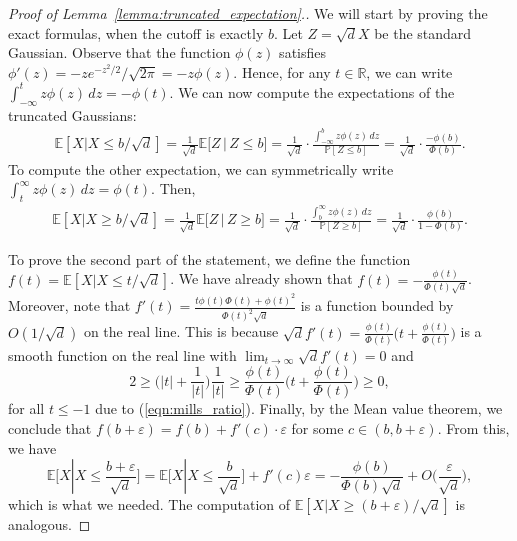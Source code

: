 \documentclass[11pt]{amsart}
\theoremstyle{definition}
\def\eps{\varepsilon}
\def\bE{\mathbb{E}}
\def\bR{\mathbb{R}}
\def\Pb{\mathbb{P}}
\begin{document}
\begin{proof}[Proof of Lemma~\ref{lemma:truncated_expectation}.]
We will start by proving the exact formulas, when the cutoff is exactly $b$. Let $Z=\sqrt{d}X$ be the standard Gaussian. Observe that the function $\phi(z)$ satisfies $\phi'(z) = -ze^{-z^2/2}/\sqrt{2\pi}=-z\phi(z)$. Hence, for any $t\in \bR$, we can write $\int_{-\infty}^{t} z \phi(z) \, dz =  -\phi(t)$. We can now compute the expectations of the truncated Gaussians:
{\smaller[0.3]
\begin{align*}
    \bE[X | X \leq b/\sqrt{d}] = \frac{1}{\sqrt{d}}\bE\bigg[Z \,\Big|\, Z \leq b\bigg]
    = \frac{1}{\sqrt{d}} \cdot \frac{\int_{-\infty}^{b} z \phi(z) \, dz}{\Pb[Z \leq b]}
    = \frac{1}{\sqrt{d}} \cdot \frac{-\phi(b)}{\Phi(b)}.
\end{align*}
}
To compute the other expectation, we can symmetrically write $\int_{t}^{\infty} z \phi(z) \, dz = \phi(t)$. Then,
{\smaller[0.3]
\begin{align*}
    \bE[X | X \geq b/\sqrt{d}] =\frac{1}{\sqrt{d}}\bE\bigg[Z \,\Big|\, Z \geq b\bigg] =  \frac{1}{\sqrt{d}} \cdot \frac{\int_{b}^{\infty} z \phi(z) \, dz}{\Pb[Z \geq b]} = \frac{1}{\sqrt{d}} \cdot \frac{\phi(b)}{1 - \Phi(b)}.
\end{align*}
}

To prove the second part of the statement, we define the function $f(t) = \bE[X | X \leq t/\sqrt{d}]$. We have already shown that $f(t)=-\frac{\phi(t)}{\Phi(t)\sqrt{d}}$. Moreover, note that $f'(t)=\frac{t\phi(t)\Phi(t)+\phi(t)^2}{\Phi(t)^2\sqrt{d}}$ is a function bounded by $O(1/\sqrt{d})$ on the real line. This is because $\sqrt{d}f'(t)=\frac{\phi(t)}{\Phi(t)}\big(t+\frac{\phi(t)}{\Phi(t)}\big)$ is a smooth function on the real line with $\lim_{t\to \infty}\sqrt{d}f'(t)=0$ and
{\smaller[0.3]
\[2\geq \Big(|t|+\frac{1}{|t|}\Big)\frac{1}{|t|}\geq \frac{\phi(t)}{\Phi(t)}\Big(t+\frac{\phi(t)}{\Phi(t)}\Big)\geq 0,\]
}
for all $t\leq -1$ due to (\ref{eqn:mills_ratio}). Finally, by the Mean value theorem, we conclude that $f(b+\eps) = f(b) + f'(c) \cdot \eps$ for some $c\in(b, b+\eps)$. From this, we have
{\smaller[0.3]
\[\bE\bigg[X | X \leq \frac{b+\eps}{\sqrt{d}}\bigg] = \bE\bigg[X | X \leq \frac{b}{\sqrt{d}}\bigg] + f'(c)\eps = -\frac{\phi(b)}{\Phi(b)\sqrt{d}} + O\bigg(\frac{\eps}{\sqrt{d}}\bigg), \]
}
which is what we needed. The computation of $\bE[X | X \geq (b+\eps)/\sqrt{d}]$ is analogous.
\end{proof}
\end{document}
